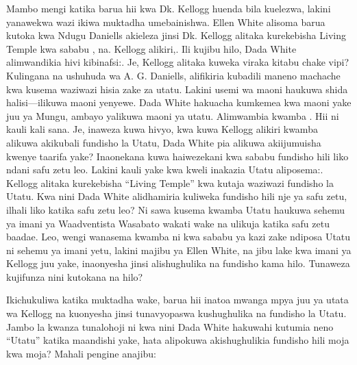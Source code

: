 Mambo mengi katika barua hii kwa Dk. Kellogg huenda bila kuelezwa, lakini yanawekwa wazi ikiwa muktadha umebainishwa. Ellen White alisoma barua kutoka kwa Ndugu Daniells akieleza jinsi Dk. Kellogg alitaka kurekebisha Living Temple kwa sababu , na. Kellogg alikiri,. Ili kujibu hilo, Dada White alimwandikia hivi kibinafsi:. Je, Kellogg alitaka kuweka viraka kitabu chake vipi? Kulingana na ushuhuda wa A. G. Daniells, alifikiria kubadili maneno machache kwa kusema waziwazi hisia zake za utatu. Lakini usemi wa maoni haukuwa shida halisi—ilikuwa maoni yenyewe. Dada White hakuacha kumkemea kwa maoni yake juu ya Mungu, ambayo yalikuwa maoni ya utatu. Alimwambia kwamba . Hii ni kauli kali sana. Je, inaweza kuwa hivyo, kwa kuwa Kellogg alikiri kwamba alikuwa akikubali fundisho la Utatu, Dada White pia alikuwa akiijumuisha kwenye taarifa yake? Inaonekana kuwa haiwezekani kwa sababu fundisho hili liko ndani safu zetu leo. Lakini kauli yake kwa kweli inakazia Utatu aliposema:. Kellogg alitaka kurekebisha “Living Temple” kwa kutaja waziwazi fundisho la Utatu. Kwa nini Dada White alidhamiria kuliweka fundisho hili nje ya safu zetu, ilhali liko katika safu zetu leo? Ni sawa kusema kwamba Utatu haukuwa sehemu ya imani ya Waadventista Wasabato wakati wake na ulikuja katika safu zetu baadae. Leo, wengi wanasema kwamba ni kwa sababu ya kazi zake ndiposa Utatu ni sehemu ya imani yetu, lakini majibu ya Ellen White, na jibu lake kwa imani ya Kellogg juu yake, inaonyesha jinsi alishughulika na fundisho kama hilo. Tunaweza kujifunza nini kutokana na hilo?

Ikichukuliwa katika muktadha wake, barua hii inatoa mwanga mpya juu ya utata wa Kellogg na kuonyesha jinsi tunavyopaswa kushughulika na fundisho la Utatu. Jambo la kwanza tunalohoji ni kwa nini Dada White hakuwahi kutumia neno “Utatu” katika maandishi yake, hata alipokuwa akishughulikia fundisho hili moja kwa moja? Mahali pengine anajibu:

